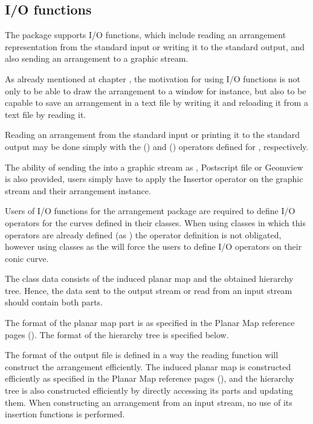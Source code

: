 \begin{itemize}
\begin{ccAdvanced}
\subsection{I/O functions}
The  package supports I/O functions, which include reading 
an arrangement representation from 
the standard input or writing it to the standard output, 
and also sending an arrangement to a graphic stream.

As already mentioned at chapter , the motivation for 
using I/O functions is not only to be able to draw the arrangement 
to a window for instance, but also to be capable to save an arrangement 
in a text file by writing it and reloading it from a text file by reading it. 
 
Reading an arrangement from the standard input or printing it to the
standard output may be done simply with the  (\ccc{ >>
}) and  (\ccc{ << }) operators defined for
, respectively. 


The ability of sending the  
into a graphic stream as , Postscript file or
Geomview is also provided, users simply have to apply the Insertor
operator on the graphic stream and their arrangement instance.

Users of I/O functions for the arrangement package are required to define I/O 
operators for the curves defined in their  classes. 
When using  classes in which this operators are already defined 
(as ) the operator definition is not obligated, 
however using  classes as the  will force 
the users to define I/O operators on their conic curve.

The  class data consists of the induced planar map and the 
obtained hierarchy tree. Hence, the data sent to the output stream or 
read from an input stream should contain both parts. 

The format of the planar map part is as specified in the Planar Map 
reference pages (). 
The format of the hierarchy tree is specified below.

The format of the output file is defined in a way the reading function 
will construct the arrangement efficiently. 
The induced planar map is constructed efficiently as specified in the Planar 
Map reference pages (), and the hierarchy tree is also 
constructed efficiently by directly accessing its parts and updating them. 
When constructing an arrangement from an input stream, no use of its 
insertion functions is performed.
 

\end{ccAdvanced}
\end{itemize}
